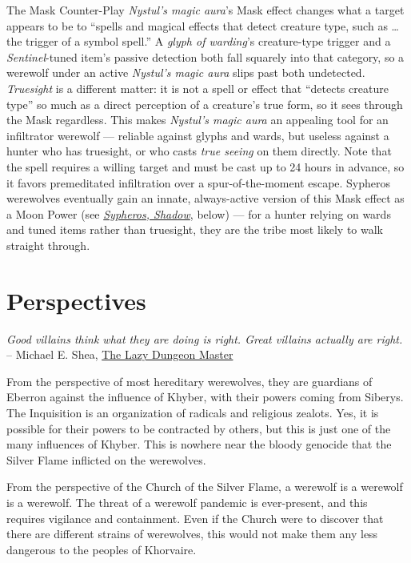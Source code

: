 \documentclass[twocolumn]{dndbook}
\begin{document}
\begin{DndSidebar}[float=!b]{The Mask Counter-Play}
    \emph{Nystul's magic aura}'s Mask effect changes what a target appears to be to ``spells and magical effects that detect creature type, such as \ldots the trigger of a symbol spell.''
    A \emph{glyph of warding}'s creature-type trigger and a \emph{Sentinel}-tuned item's passive detection both fall squarely into that category, so a werewolf under an active \emph{Nystul's magic aura} slips past both undetected.
    \emph{Truesight} is a different matter: it is not a spell or effect that ``detects creature type'' so much as a direct perception of a creature's true form, so it sees through the Mask regardless.
    This makes \emph{Nystul's magic aura} an appealing tool for an infiltrator werewolf --- reliable against glyphs and wards, but useless against a hunter who has truesight, or who casts \emph{true seeing} on them directly.
    Note that the spell requires a willing target and must be cast up to 24 hours in advance, so it favors premeditated infiltration over a spur-of-the-moment escape.
    Sypheros werewolves eventually gain an innate, always-active version of this Mask effect as a Moon Power (see \hyperref[sec:sypheros]{\emph{Sypheros, Shadow}}, below) --- for a hunter relying on wards and tuned items rather than truesight, they are the tribe most likely to walk straight through.
\end{DndSidebar}

\section*{Perspectives}

\emph{Good villains think what they are doing is right. Great villains actually are right.}
-- Michael E. Shea, \href{https://slyflourish.com/lazydm/}{The Lazy Dungeon Master}

From the perspective of most hereditary werewolves, they are guardians of Eberron against the influence of Khyber, with their powers coming from Siberys.
The Inquisition is an organization of radicals and religious zealots.
Yes, it is possible for their powers to be contracted by others, but this is just one of the many influences of Khyber.
This is nowhere near the bloody genocide that the Silver Flame inflicted on the werewolves.\par

From the perspective of the Church of the Silver Flame, a werewolf is a werewolf is a werewolf.
The threat of a werewolf pandemic is ever-present, and this requires vigilance and containment.
Even if the Church were to discover that there are different strains of werewolves, this would not make them any less dangerous to the peoples of Khorvaire.\par
\end{document}
